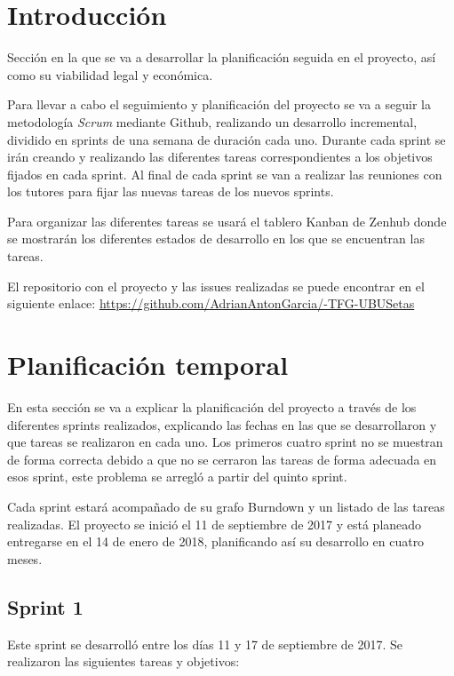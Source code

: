 
\section{Introducción}

Sección en la que se va a desarrollar la planificación seguida en el proyecto, así como su viabilidad legal y económica.

Para llevar a cabo el seguimiento y planificación del proyecto se va a seguir la metodología \textit{Scrum} mediante Github, realizando un desarrollo incremental, dividido en sprints de una semana de duración cada uno. Durante cada sprint se irán creando y realizando las diferentes tareas correspondientes a los objetivos fijados en cada sprint. Al final de cada sprint se van a realizar las reuniones con los tutores para fijar las nuevas tareas de los nuevos sprints.

Para organizar las diferentes tareas se usará el tablero Kanban de Zenhub donde se mostrarán los diferentes estados de desarrollo en los que se encuentran las tareas.

El repositorio con el proyecto y las issues realizadas se puede encontrar en el siguiente enlace:
\url{https://github.com/AdrianAntonGarcia/-TFG-UBUSetas}

\section{Planificación temporal}

En esta sección se va a explicar la planificación del proyecto a través de los diferentes sprints realizados, explicando las fechas en las que se desarrollaron y que tareas se realizaron en cada uno. Los primeros cuatro sprint no se muestran de forma correcta debido a que no se cerraron las tareas de forma adecuada en esos sprint, este problema se arregló a partir del quinto sprint.

Cada sprint estará acompañado de su grafo Burndown y un listado de las tareas realizadas. El proyecto se inició el 11 de septiembre de 2017 y está planeado entregarse en el 14 de enero de 2018, planificando así su desarrollo en cuatro meses.

\subsection{Sprint 1}

Este sprint se desarrolló entre los días 11 y 17 de septiembre de 2017. Se realizaron las siguientes tareas y objetivos:

